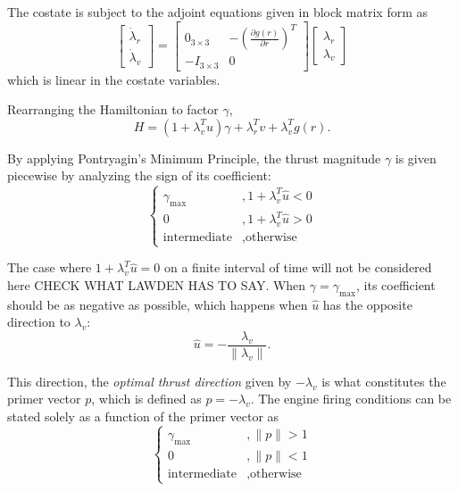 The costate is subject to the adjoint equations given in block matrix form as
\begin{equation}
    \begin{bmatrix}
        \dot \lambda_r \\ \dot \lambda_v
    \end{bmatrix} = \begin{bmatrix}
        0_{3\times3} & -\left(\frac{\partial g(r)}{\partial r}\right)^T \\
        -I_{3\times3} & 0
    \end{bmatrix} \begin{bmatrix}
        \lambda_r \\ \lambda_v
    \end{bmatrix}
\end{equation}
which is linear in the costate variables. 

Rearranging the Hamiltonian to factor \(\gamma \), 
\begin{equation}
    H = (1 + \lambda_v^T \hat u) \gamma + \lambda_r^T v + \lambda_v^T g(r).
\end{equation}

By applying Pontryagin's Minimum Principle, the thrust magnitude \(\gamma\) is given piecewise by analyzing the sign of its coefficient:
\begin{equation}
    \begin{cases}
        \gamma_{\max}&, 1+\lambda_v^T \hat u < 0 \\
        0&, 1 + \lambda_v^T \hat u > 0 \\
        \text{intermediate}&, \text{otherwise}
    \end{cases}
\end{equation}

The case where \(1 + \lambda_v^T \hat u = 0\) on a finite interval of time will not be considered here CHECK WHAT LAWDEN HAS TO SAY. When \(\gamma = \gamma_{\max}\), its coefficient should be as negative as possible, which happens when \(\hat{u}\) has the opposite direction to \(\lambda_v\):
\begin{equation}
    \hat u = - \frac{\lambda_v}{\lVert \lambda_v \rVert}.
\end{equation}

This direction, the \textit{optimal thrust direction} given by \(-\lambda_v\) is what constitutes the primer vector \(p\), which is defined as \(p = -\lambda_v\). The engine firing conditions can be stated solely as a function of the primer vector as~\cite{Conway_2010}
\begin{equation}
    \begin{cases}
        \gamma_{\max}&, \lVert p \rVert > 1 \\
        0&, \lVert p \rVert < 1 \\
        \text{intermediate}&, \text{otherwise}
    \end{cases}
\end{equation}

